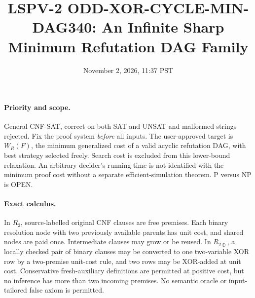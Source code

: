 \documentclass[11pt]{article}
\title{LSPV-2 ODD-XOR-CYCLE-MIN-DAG340: An Infinite Sharp Minimum Refutation DAG Family}
\date{November 2, 2026, 11:37 PST}
\begin{document}
\maketitle
\paragraph{Priority and scope.} General CNF-SAT, correct on both SAT and UNSAT and malformed strings rejected. Fix the proof system \emph{before} all inputs. The user-approved target is \(W_R(F)\), the minimum generalized cost of a valid acyclic refutation DAG, with best strategy selected freely. Search cost is excluded from this lower-bound relaxation. An arbitrary decider's running time is not identified with the minimum proof cost without a separate efficient-simulation theorem. P versus NP is OPEN.
\paragraph{Exact calculus.} In \(R_2\), source-labelled original CNF clauses are free premises. Each binary resolution node with two previously available parents has unit cost, and shared nodes are paid once. Intermediate clauses may grow or be reused. In \(R_{2\oplus}\), a locally checked pair of binary clauses may be converted to one two-variable XOR row by a two-premise unit-cost rule, and two rows may be XOR-added at unit cost. Conservative fresh-auxiliary definitions are permitted at positive cost, but no inference has more than two incoming premises. No semantic oracle or input-tailored false axiom is permitted.
\end{document}
